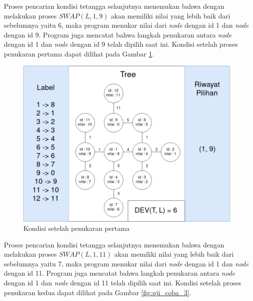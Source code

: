 Proses pencarian kondisi tetangga selanjutnya menemukan bahwa dengan melakukan proses $ SWAP(L, 1, 9) $ akan memiliki nilai yang lebih baik dari sebelumnya yaitu 6, maka program menukar nilai dari \textit{node} dengan id 1 dan \textit{node} dengan id 9. Program juga mencatat bahwa langkah penukaran antara \textit{node} dengan id 1 dan \textit{node} dengan id 9 telah dipilih saat ini. Kondisi setelah proses penukaran pertama dapat dilihat pada Gambar \ref{fig:uji_coba_2}.

\begin{figure}[ht]
	\centering\includegraphics[width=1\textwidth]{bab5/figures/uji_coba_2.png}
	\caption{Kondisi setelah penukaran pertama}
	\label{fig:uji_coba_2}
\end{figure}

Proses pencarian kondisi tetangga selanjutnya menemukan bahwa dengan melakukan proses $ SWAP(L, 1, 11) $ akan memiliki nilai yang lebih baik dari sebelumnya yaitu 7, maka program menukar nilai dari \textit{node} dengan id 1 dan \textit{node} dengan id 11. Program juga mencatat bahwa langkah penukaran antara \textit{node} dengan id 1 dan \textit{node} dengan id 11 telah dipilih saat ini. Kondisi setelah proses penukaran kedua dapat dilihat pada Gambar \ref{fig:uji_coba_3}.

